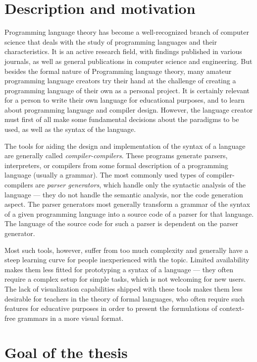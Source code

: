 \documentclass[english,bachelors,forcepolishlogotype]{wizthesis}
\begin{document}
\section{Description and motivation} \label{sec:description-and-motivation}

Programming language theory has become a well-recognized branch of computer
science that deals with the study of programming languages and their
characteristics. It is an active research field, with findings published in
various journals, as well as general publications in computer science and
engineering. But besides the formal nature of Programming language theory, many
amateur programming language creators try their hand at the challenge of
creating a programming language of their own as a personal project. It is
certainly relevant for a person to write their own language for educational
purposes, and to learn about programming language and compiler design. However,
the language creator must first of all make some fundamental decisions about the
paradigms to be used, as well as the syntax of the language.

The tools for aiding the design and implementation of the syntax of a language
are generally called \emph{compiler-compilers}. These programs generate parsers,
interpreters, or compilers from some formal description of a programming
language (usually a grammar). The most commonly used types of compiler-compilers
are \emph{parser generators}, which handle only the syntactic analysis of the
language --- they do not handle the semantic analysis, nor the code generation
aspect. The parser generators most generally transform a grammar of the syntax
of a given programming language into a source code of a parser for that
language. The language of the source code for such a parser is dependent on the
parser generator.

Most such tools, however, suffer from too much complexity and generally have a
steep learning curve for people inexperienced with the topic. Limited
availability makes them less fitted for prototyping a syntax of a language ---
they often require a complex setup for simple tasks, which is not welcoming for
new users. The lack of visualization capabilities shipped with these tools makes
them less desirable for teachers in the theory of formal languages, who often
require such features for educative purposes in order to present the
formulations of context-free grammars in a more visual format.

\section{Goal of the thesis}
\end{document}
